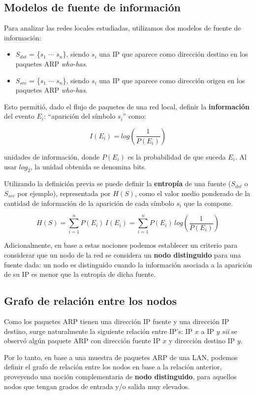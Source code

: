 \subsection{Modelos de fuente de información}
\label{subsec:modelos-fuente-informacion}

Para analizar las redes locales estudiadas, utilizamos dos modelos de fuente de información:
\vspace*{-2mm}

\begin{itemize}
  \item $S_{dst}$ = \{$s_1$ $\cdots$ $s_n$\}, siendo $s_i$ una IP que aparece como dirección destino en los paquetes ARP \emph{who-has}.
  \item $S_{src}$ = \{$s_1$ $\cdots$ $s_n$\}, siendo $s_i$ una IP que aparece como dirección origen en los paquetes ARP \emph{who-has}.
\end{itemize}

Esto permitió, dado el flujo de paquetes de una red local, definir la \textbf{información} del evento $E_i$: ``aparición del símbolo $s_i$'' como:

$$I (E_i) = log\left(\frac{1}{P(E_i)}\right)$$

unidades de información, donde $P(E_i)$ es la probabilidad de que suceda $E_i$. Al usar $log_2$, la unidad obtenida se denomina bits.

Utilizando la definición previa se puede definir la \textbf{entropía} de una fuente ($S_{dst}$ o $S_{src}$ por ejemplo), representada por $H(S)$, como el valor medio ponderado de la cantidad de información de la aparición de cada símbolo $s_i$ que la compone.

$$H(S) = \sum_{i=1}^{n} P(E_i)\,I(E_i) = \sum_{i=1}^{n} P(E_i)\,log\left(\frac{1}{P(E_i)}\right)$$

Adicionalmente, en base a estas nociones podemos establecer un criterio para considerar que un nodo de la red se considera un \textbf{nodo distinguido} para una fuente dada: un nodo es distinguido cuando la información asociada a la aparición de su IP es menor que la entropía de dicha fuente.

\subsection{Grafo de relación entre los nodos}
\label{subsec:grafo-relacion-nodos}

Como los paquetes ARP tienen una dirección IP fuente y una dirección IP destino, surge naturalmente la siguiente relación entre IP's: IP $x$ a IP $y$ \emph{sii} se observó algún paquete ARP con dirección fuente IP $x$ y dirección destino IP $y$.

Por lo tanto, en base a una muestra de paquetes ARP de una LAN, podemos definir el grafo de relación entre los nodos en base a la relación anterior, proveyendo una noción complementaria de \textbf{nodo distinguido}, para aquellos nodos que tengan grados de entrada y/o salida muy elevados.
